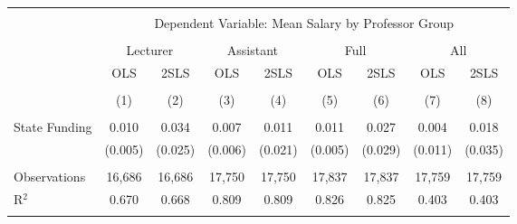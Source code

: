 
\begin{tabular}{@{\extracolsep{5pt}}lcccccccc} 
\\[-1.8ex]\hline 
\hline \\[-1.8ex] 
 & \multicolumn{8}{c}{Dependent Variable: Mean Salary by Professor Group} \\ 
\cline{2-9} 
\\[-1.8ex] & \multicolumn{2}{c}{Lecturer} & \multicolumn{2}{c}{Assistant} & \multicolumn{2}{c}{Full} & \multicolumn{2}{c}{All} \\ 
 & OLS & 2SLS & OLS & 2SLS & OLS & 2SLS & OLS & 2SLS \\ 
\\[-1.8ex] & (1) & (2) & (3) & (4) & (5) & (6) & (7) & (8)\\ 
\hline \\[-1.8ex] 
 State Funding & 0.010 & 0.034 & 0.007 & 0.011 & 0.011 & 0.027 & 0.004 & 0.018 \\ 
  & (0.005) & (0.025) & (0.006) & (0.021) & (0.005) & (0.029) & (0.011) & (0.035) \\ 
 \hline \\[-1.8ex] 
Observations & 16,686 & 16,686 & 17,750 & 17,750 & 17,837 & 17,837 & 17,759 & 17,759 \\ 
R$^{2}$ & 0.670 & 0.668 & 0.809 & 0.809 & 0.826 & 0.825 & 0.403 & 0.403 \\ 
\hline 
\hline \\[-1.8ex] 
\end{tabular} 
